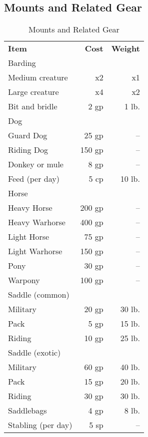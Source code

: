 \subsection{Mounts and Related Gear}

\begin{table}[htb]
\caption{Mounts and Related Gear}
\centering
\begin{tabular}{l r r}
\textbf{Item} & \textbf{Cost} & \textbf{Weight}\\
Barding&&\\
\hspace{.5cm}Medium creature & x2 & x1\\
\hspace{.5cm}Large creature & x4 & x2\\
Bit and bridle & 2 gp & 1 lb.\\
Dog&&\\
\hspace{.5cm}Guard Dog & 25 gp & --\\
\hspace{.5cm}Riding Dog & 150 gp & --\\
Donkey or mule & 8 gp & --\\
Feed (per day) & 5 cp & 10 lb.\\
Horse&&\\
\hspace{.5cm}Heavy Horse & 200 gp & --\\
\hspace{.5cm}Heavy Warhorse & 400 gp & --\\
\hspace{.5cm}Light Horse & 75 gp & --\\
\hspace{.5cm}Light Warhorse & 150 gp & --\\
\hspace{.5cm}Pony & 30 gp & --\\
\hspace{.5cm}Warpony & 100 gp & --\\
Saddle (common)&&\\
\hspace{.5cm}Military & 20 gp & 30 lb.\\
\hspace{.5cm}Pack & 5 gp & 15 lb.\\
\hspace{.5cm}Riding & 10 gp & 25 lb.\\
Saddle (exotic)&&\\
\hspace{.5cm}Military & 60 gp & 40 lb.\\
\hspace{.5cm}Pack & 15 gp & 20 lb.\\
\hspace{.5cm}Riding & 30 gp & 30 lb.\\
Saddlebags & 4 gp & 8 lb.\\
Stabling (per day) & 5 sp & --\\
\end{tabular}
\end{table}

